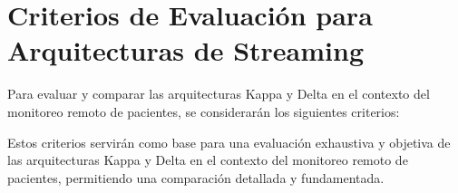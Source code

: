 \section{Criterios de Evaluación para Arquitecturas de Streaming}

Para evaluar y comparar las arquitecturas Kappa y Delta en el contexto del monitoreo remoto de pacientes, se considerarán los siguientes criterios:







Estos criterios servirán como base para una evaluación exhaustiva y objetiva de las arquitecturas Kappa y Delta en el contexto del monitoreo remoto de pacientes, permitiendo una comparación detallada y fundamentada.
\newpage
